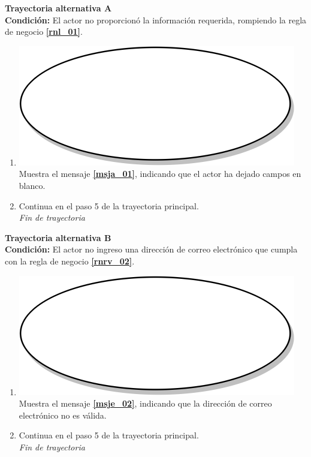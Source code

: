 \textbf{Trayectoria alternativa A} \label{cu1_ta_a} \\
\textbf{Condición:} El actor no proporcionó la información requerida, rompiendo la regla de negocio \textbf{\ref{rnl_01}}.\\
 \begin{enumerate}[label=A\arabic*]
    \item {\includegraphics[scale=.05]{Capitulo3/img/proceso.png} Muestra el mensaje \textbf{\ref{msja_01}}, indicando que el actor ha dejado campos en blanco.}
    \item {Continua en el paso 5 de la trayectoria principal.} \\
    \textit{Fin de trayectoria} \\
\end{enumerate}

\textbf{Trayectoria alternativa B} \label{cu1_ta_b}\\
\textbf{Condición:} El actor no ingreso una dirección de correo electrónico que cumpla con la regla de negocio \textbf{\ref{rnrv_02}}.\\
 \begin{enumerate}[label=B\arabic*]
    \item {\includegraphics[scale=.05]{Capitulo3/img/proceso.png} Muestra el mensaje \textbf{\ref{msje_02}}, indicando que la dirección de correo electrónico no es válida.}
    \item {Continua en el paso 5 de la trayectoria principal.} \\
    \textit{Fin de trayectoria} \\
\end{enumerate}

